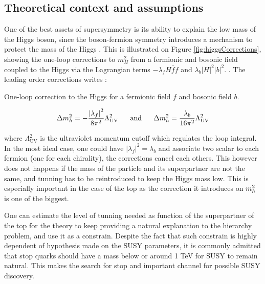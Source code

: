         \subsection{Theoretical context and assumptions}

        One of the best assets of supersymmetry is its ability to explain the low mass
        of the Higgs boson, since the boson-fermion symmetry introduces a mechanism to
        protect the mass of the Higgs . This is illustrated on Figure
        \ref{fig:higgsCorrections}, showing the one-loop corrections to $m_H^2$
        from a fermionic and bosonic field coupled to the Higgs via the Lagrangian terms
        $- \lambda_f H \bar{f} f$ and $\lambda_b \left| H \right|^2 \left| b \right|^2$.
        . The leading order corrections writes :

                     { One-loop correction to the Higgs for a fermionic field $f$ and bosonic field $b$.}

        \begin{equation}
            \Delta m_{h}^2 = - \frac{\left| \lambda_f \right|^2}{8\pi^2} \Lambda^2_{\text{UV}}
            \, \, \, \, \, \, \, \, \, \, \text{and} \, \, \, \, \, \, \, \, \, \,
            \Delta m_{h}^2 =   \frac{\lambda_b}{16\pi^2} \Lambda^2_{\text{UV}}
        \end{equation}

        where $\Lambda^2_{\text{UV}}$ is the ultraviolet momentum cutoff which regulates
        the loop integral. In the most ideal case, one could have $\left| \lambda_f \right|^2
        = \lambda_b$ and associate two scalar to each fermion (one for each chirality), 
        the corrections cancel each others. 
        This however does not happens if the mass of the particle and its superpartner 
        are not the same, and tunning has to be reintroduced to keep the Higgs mass low.
        This is especially important in the case of the top as the correction it introduces
        on $m_{h}^2$ is one of the biggest. 
        
        One can estimate the level of tunning needed as function of the superpartner of
        the top for the theory to keep providing a natural explanation to the hierarchy
        problem, and use it as a constrain. Despite the fact that such constrain is 
        highly dependent of hypothesis made on the SUSY parameters, it is commonly admitted 
        that stop quarks should have a mass below or around 1 TeV for SUSY to remain natural.
        This makes the search for stop and important channel for possible SUSY discovery.

